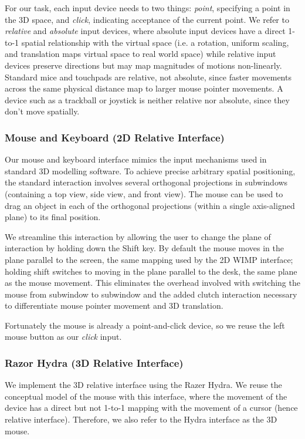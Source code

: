 For our task, each input device needs to two things: {\it point}, specifying a
point in the 3D space, and {\it click}, indicating acceptance of the current
point. We refer to {\it relative} and {\it absolute} input devices, where
absolute input devices have a direct 1-to-1 spatial relationship with the
virtual space (i.e. a rotation, uniform scaling, and translation maps virtual
space to real world space) while relative input devices preserve directions
but may map magnitudes of motions non-linearly. Standard mice and touchpads
are relative, not absolute, since faster movements across the same physical
distance map to larger mouse pointer movements. A device such as a trackball
or joystick is neither relative nor absolute, since they don't move spatially.

\subsubsection{Mouse and Keyboard (2D Relative Interface)}
Our mouse and keyboard interface mimics the input mechanisms used in standard
3D modelling software. To achieve precise arbitrary spatial positioning, the
standard interaction involves several orthogonal projections in subwindows
(containing a top view, side view, and front view). The mouse can be used to
drag an object in each of the orthogonal projections (within a single
axis-aligned plane) to its final position.

We streamline this interaction by allowing the user to change the plane of
interaction by holding down the Shift key. By default the mouse moves in the
plane parallel to the screen, the same mapping used by the 2D WIMP interface;
holding shift switches to moving in the plane parallel to the desk, the same
plane as the mouse movement. This eliminates the overhead involved with
switching the mouse from subwindow to subwindow and the added clutch
interaction \cite{bravenuiworld} necessary to differentiate mouse pointer
movement and 3D translation.

Fortunately the mouse is already a point-and-click device, so we reuse the
left mouse button as our {\it click} input.

\subsubsection{Razor Hydra (3D Relative Interface)}
We implement the 3D relative interface using the Razer Hydra. We reuse the
conceptual model of the mouse with this interface, where the movement of the
device has a direct but not 1-to-1 mapping with the movement of a cursor (hence
relative interface). Therefore, we also refer to the Hydra interface as the 3D
mouse.


